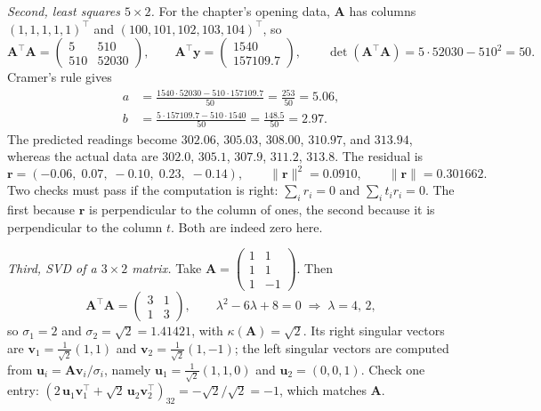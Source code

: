 \emph{Second, least squares $5\times2$.} For the chapter's opening data,
$\mathbf{A}$ has columns $(1,1,1,1,1)^{\top}$ and $(100,101,102,103,104)^{\top}$, so
\[
  \mathbf{A}^{\top}\mathbf{A}=
  \begin{pmatrix}5&510\\ 510&52030\end{pmatrix},
  \qquad
  \mathbf{A}^{\top}\mathbf{y}=\begin{pmatrix}1540\\ 157109.7\end{pmatrix},
  \qquad
  \det(\mathbf{A}^{\top}\mathbf{A})=5\cdot52030-510^{2}=50 .
\]
Cramer's rule gives
\begin{align*}
  a&=\frac{1540\cdot52030-510\cdot157109.7}{50}=\frac{253}{50}=5.06,\\
  b&=\frac{5\cdot157109.7-510\cdot1540}{50}=\frac{148.5}{50}=2.97 .
\end{align*}
The predicted readings become $302.06$, $305.03$, $308.00$, $310.97$, and $313.94$,
whereas the actual data are $302.0$, $305.1$, $307.9$, $311.2$, $313.8$. The residual is
\[
  \mathbf{r}=(-0.06,\;0.07,\;-0.10,\;0.23,\;-0.14),
  \qquad
  \|\mathbf{r}\|^{2}=0.0910,\qquad \|\mathbf{r}\|=0.301662 .
\]
Two checks must pass if the computation is right: $\sum_{i}r_{i}=0$ and
$\sum_{i}t_{i}r_{i}=0$. The first because $\mathbf{r}$ is perpendicular to the column of ones, the
second because it is perpendicular to the column $t$. Both are indeed zero here.

\emph{Third, SVD of a $3\times2$ matrix.} Take
$\mathbf{A}=\begin{pmatrix}1&1\\ 1&1\\ 1&-1\end{pmatrix}$. Then
\[
  \mathbf{A}^{\top}\mathbf{A}=\begin{pmatrix}3&1\\ 1&3\end{pmatrix},
  \qquad
  \lambda^{2}-6\lambda+8=0\;\Longrightarrow\;\lambda=4,\,2,
\]
so $\sigma_{1}=2$ and $\sigma_{2}=\sqrt{2}=1.41421$, with
$\kappa(\mathbf{A})=\sqrt{2}$. Its right singular vectors are
$\mathbf{v}_{1}=\frac{1}{\sqrt{2}}(1,1)$ and
$\mathbf{v}_{2}=\frac{1}{\sqrt{2}}(1,-1)$; the left singular vectors are computed from
$\mathbf{u}_{i}=\mathbf{A}\mathbf{v}_{i}/\sigma_{i}$, namely
$\mathbf{u}_{1}=\frac{1}{\sqrt{2}}(1,1,0)$ and $\mathbf{u}_{2}=(0,0,1)$. Check one entry:
$(2\,\mathbf{u}_{1}\mathbf{v}_{1}^{\top}+\sqrt{2}\,\mathbf{u}_{2}\mathbf{v}_{2}^{\top})_{32}
=-\sqrt{2}/\sqrt{2}=-1$, which matches $\mathbf{A}$.

